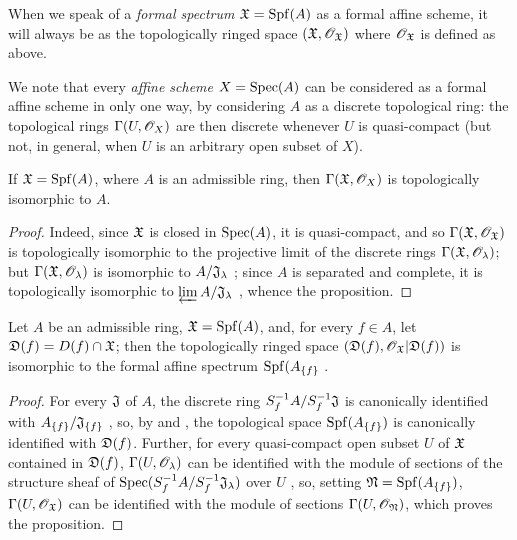 When we speak of a \emph{formal spectrum $\mathfrak{X}={\mathop{\mathrm{Spf}}\nolimits}(A)$} as a formal affine scheme, it will always be as the topologically ringed space $(\mathfrak{X},\mathscr{O}_\mathfrak{X})$ where $\mathscr{O}_\mathfrak{X}$ is defined as above.

We note that every \emph{affine scheme} $X={\mathop{\mathrm{Spec}}\nolimits}(A)$ can be considered as a formal affine scheme in only one way, by considering $A$ as a discrete topological ring: the topological rings $\Gamma(U,\mathscr{O}_X)$ are then discrete whenever $U$ is quasi-compact (but not, in general, when $U$ is an arbitrary open subset of $X$).

\begin{prop}[10.1.3]
\label{1.10.1.3}
If $\mathfrak{X}={\mathop{\mathrm{Spf}}\nolimits}(A)$, where $A$ is an admissible ring, then $\Gamma(\mathfrak{X},\mathscr{O}_X)$ is topologically isomorphic to $A$.
\end{prop}

\begin{proof}
\label{proof-1.10.1.3}
Indeed, since $\mathfrak{X}$ is closed in ${\mathop{\mathrm{Spec}}\nolimits}(A)$, it is quasi-compact, and so $\Gamma(\mathfrak{X},\mathscr{O}_\mathfrak{X})$ is topologically isomorphic to the projective limit of the discrete rings $\Gamma(\mathfrak{X},\mathscr{O}_\lambda)$; but $\Gamma(\mathfrak{X},\mathscr{O}_\lambda)$ is isomorphic to $A/\mathfrak{J}_\lambda$ ; since $A$ is separated and complete, it is topologically isomorphic to $\varprojlim A/\mathfrak{J}_\lambda$ , whence the proposition.
\end{proof}

\begin{prop}[10.1.4]
\label{1.10.1.4}
Let $A$ be an admissible ring, $\mathfrak{X}={\mathop{\mathrm{Spf}}\nolimits}(A)$, and, for every $f\in A$, let $\mathfrak{D}(f)=D(f)\cap\mathfrak{X}$; then the topologically ringed space $(\mathfrak{D}(f),\mathscr{O}_\mathfrak{X}|\mathfrak{D}(f))$ is isomorphic to the formal affine spectrum ${\mathop{\mathrm{Spf}}\nolimits}(A_{\{f\}}$ .
\end{prop}

\begin{proof}
\label{proof-1.10.1.4}
For every  $\mathfrak{J}$ of $A$, the discrete ring $S_f^{-1}A/ S_f^{-1}\mathfrak{J}$ is canonically identified with $A_{\{f\}}/\mathfrak{J}_{\{f\}}$ , so, by  and , the topological space ${\mathop{\mathrm{Spf}}\nolimits}(A_{\{f\}})$ is canonically identified with $\mathfrak{D}(f)$.
Further, for every quasi-compact open subset $U$ of $\mathfrak{X}$ contained in $\mathfrak{D}(f)$, $\Gamma(U,\mathscr{O}_\lambda)$ can be identified with the module of sections of the structure sheaf of ${\mathop{\mathrm{Spec}}\nolimits}(S_f^{-1}A/ S_f^{-1}\mathfrak{J}_\lambda)$ over $U$ , so, setting $\mathfrak{N}={\mathop{\mathrm{Spf}}\nolimits}(A_{\{f\}})$, $\Gamma(U,\mathscr{O}_\mathfrak{X})$ can be identified with the module of sections $\Gamma(U,\mathscr{O}_\mathfrak{N})$, which proves the proposition.
\end{proof}

